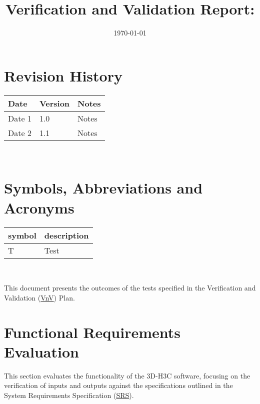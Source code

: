 \documentclass[12pt, titlepage]{article}
\begin{document}
\title{Verification and Validation Report: \progname} 
\author{\authname}
\date{\today}
	
\maketitle


\section{Revision History}

\begin{tabularx}{\textwidth}{p{3cm}p{2cm}X}
\toprule {\bf Date} & {\bf Version} & {\bf Notes}\\
\midrule
Date 1 & 1.0 & Notes\\
Date 2 & 1.1 & Notes\\
\bottomrule
\end{tabularx}

~\newpage

\section{Symbols, Abbreviations and Acronyms}

\renewcommand{\arraystretch}{1.2}
\begin{tabular}{l l} 
  \toprule		
  \textbf{symbol} & \textbf{description}\\
  \midrule 
  T & Test\\
  \bottomrule
\end{tabular}\\


\newpage

\tableofcontents

\listoftables %

\listoffigures %

\newpage


This document presents the outcomes of the tests specified in the Verification and Validation (\href{https://github.com/rnorouziani/3D-H3C/blob/main/docs/VnVPlan/VnVPlan.pdf}{VnV}) Plan.

\section{Functional Requirements Evaluation}


This section evaluates the functionality of the 3D-H3C software, focusing on the verification of inputs and outputs against the specifications outlined in the System Requirements Specification (\href{https://github.com/rnorouziani/3D-H3C/blob/main/docs/SRS/SRS.pdf}{SRS}).
\end{document}
